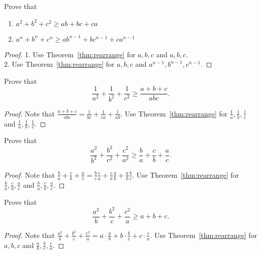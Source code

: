 \documentclass[../main.tex]{subfiles}
\begin{document}
\begin{exercise}
    Prove that
    \begin{enumerate}
        \item $a^2 + b^2 + c^2 \geq ab + bc + ca$
        \item $a^n + b^n + c^n \geq a b^{n-1} + b c^{n-1} + c a^{n-1}$
    \end{enumerate}
\end{exercise}
\begin{proof}
    1. Use Theorem~\ref{thm:rearrange} for $a, b, c$ and $a, b, c$.\\
    2. Use Theorem~\ref{thm:rearrange} for $a, b, c$ and $a^{n-1}, b^{n-1}, c^{n-1}$.
\end{proof}

\begin{exercise}
    Prove that
    \[
        \frac{1}{a^2} + \frac{1}{b^2} + \frac{1}{c^2} \geq \frac{a + b + c}{abc}.
    \]
\end{exercise}
\begin{proof}
    Note that $\frac{a+b+c}{abc} = \frac{1}{bc} + \frac{1}{ca} + \frac{1}{ab}$.
    Use Theorem~\ref{thm:rearrange} for $\frac 1 a, \frac 1 b, \frac 1 c$ and $\frac 1 a, \frac 1 b, \frac 1 c$.
\end{proof}

\begin{exercise}
    Prove that
    \[
        \frac{a^2}{b^2} + \frac{b^2}{c^2} + \frac{c^2}{a^2} \geq \frac b a + \frac c b + \frac a c .
    \]
\end{exercise}
\begin{proof}
    Note that $\frac b a + \frac c b + \frac a c = \frac b c \frac c a + \frac c a \frac a b + \frac a b \frac b c$.
    Use Theorem~\ref{thm:rearrange} for $\frac b a, \frac c b, \frac a c$ and $\frac b a, \frac c b, \frac a c$.
\end{proof}

\begin{exercise}
    Prove that
    \[
        \frac{a^2}{b} + \frac{b^2}{c} + \frac{c^2}{a} \geq a + b + c.
    \]
\end{exercise}
\begin{proof}
    Note that $\frac{a^2}{b} + \frac{b^2}{c} + \frac{c^2}{a} = a \cdot \frac a b + b \cdot \frac b c + c \cdot \frac c a$.
    Use Theorem~\ref{thm:rearrange} for $a, b, c$ and $\frac a b, \frac b c, \frac c a$.
\end{proof}
\end{document}
